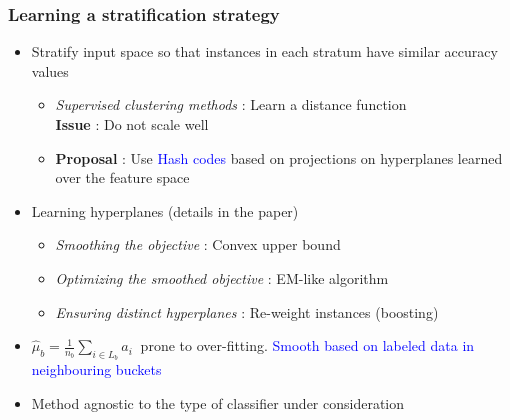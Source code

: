 \documentclass[usenames,dvipsnames, 11pt]{beamer}
\newcommand{\acc}{{a}}
\newcommand{\estSb}{{\mbox{$\hat{\mu}$}}}
\newlength{\wideitemsep}
\let\olditem\item
\renewcommand{\item}{\setlength{\itemsep}{\wideitemsep}\olditem}
\begin{document}
\begin{frame}
\frametitle{Learning a stratification strategy} %
\begin{itemize}
\pause
\item Stratify input space so that instances in each stratum have similar accuracy values
\pause
\begin{itemize}
\item \emph{Supervised clustering methods} : Learn a distance function \\ \textbf{Issue} : Do not scale well 
\item \textbf{Proposal} : Use \textcolor{blue}{Hash codes} based on projections on hyperplanes learned over the feature space
\end{itemize}
\pause
\item Learning hyperplanes (details in the paper)
\begin{itemize}
\item \emph{Smoothing the objective} : Convex upper bound
\item \emph{Optimizing the smoothed objective} : EM-like algorithm
\item \emph{Ensuring distinct hyperplanes} : Re-weight instances (boosting)
\end{itemize}
\pause
\item $\estSb_b=\frac{1}{n_b}\sum_{i\in L_b}\acc_i~$ prone to over-fitting. \textcolor{blue}{Smooth based on labeled data in neighbouring buckets}
\pause
\item Method agnostic to the type of classifier under consideration
\end{itemize}
\end{frame}
\end{document}
